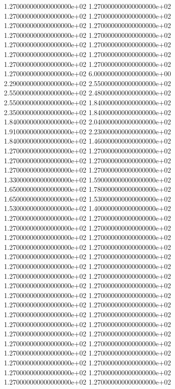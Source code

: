 1.270000000000000000e+02 1.270000000000000000e+02 1.270000000000000000e+02 1.270000000000000000e+02 1.270000000000000000e+02 1.270000000000000000e+02 1.270000000000000000e+02 1.270000000000000000e+02 1.270000000000000000e+02 1.270000000000000000e+02 1.270000000000000000e+02 1.270000000000000000e+02 1.270000000000000000e+02 1.270000000000000000e+02 1.270000000000000000e+02 6.000000000000000000e+00 2.290000000000000000e+02 2.550000000000000000e+02 2.550000000000000000e+02 2.480000000000000000e+02 2.550000000000000000e+02 1.840000000000000000e+02 2.350000000000000000e+02 1.840000000000000000e+02 1.840000000000000000e+02 2.040000000000000000e+02 1.910000000000000000e+02 2.230000000000000000e+02 1.840000000000000000e+02 1.460000000000000000e+02 1.270000000000000000e+02 1.270000000000000000e+02 1.270000000000000000e+02 1.270000000000000000e+02 1.270000000000000000e+02 1.270000000000000000e+02 1.330000000000000000e+02 1.590000000000000000e+02 1.650000000000000000e+02 1.780000000000000000e+02 1.650000000000000000e+02 1.530000000000000000e+02 1.530000000000000000e+02 1.400000000000000000e+02 1.270000000000000000e+02 1.270000000000000000e+02 1.270000000000000000e+02 1.270000000000000000e+02 1.270000000000000000e+02 1.270000000000000000e+02 1.270000000000000000e+02 1.270000000000000000e+02 1.270000000000000000e+02 1.270000000000000000e+02 1.270000000000000000e+02 1.270000000000000000e+02 1.270000000000000000e+02 1.270000000000000000e+02 1.270000000000000000e+02 1.270000000000000000e+02 1.270000000000000000e+02 1.270000000000000000e+02 1.270000000000000000e+02 1.270000000000000000e+02 1.270000000000000000e+02 1.270000000000000000e+02 1.270000000000000000e+02 1.270000000000000000e+02 1.270000000000000000e+02 1.270000000000000000e+02 1.270000000000000000e+02 1.270000000000000000e+02 1.270000000000000000e+02 1.270000000000000000e+02 1.270000000000000000e+02 1.270000000000000000e+02 1.270000000000000000e+02 1.270000000000000000e+02 1.270000000000000000e+02 1.270000000000000000e+02
